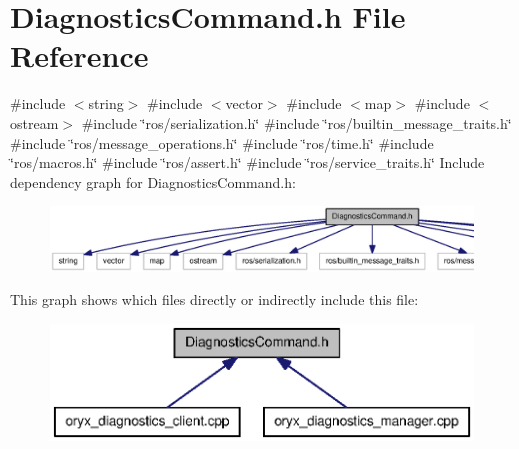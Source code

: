 \section{\-Diagnostics\-Command.\-h \-File \-Reference}
\label{DiagnosticsCommand_8h}
{\ttfamily \#include $<$string$>$}\*
{\ttfamily \#include $<$vector$>$}\*
{\ttfamily \#include $<$map$>$}\*
{\ttfamily \#include $<$ostream$>$}\*
{\ttfamily \#include \char`\"{}ros/serialization.\-h\char`\"{}}\*
{\ttfamily \#include \char`\"{}ros/builtin\-\_\-message\-\_\-traits.\-h\char`\"{}}\*
{\ttfamily \#include \char`\"{}ros/message\-\_\-operations.\-h\char`\"{}}\*
{\ttfamily \#include \char`\"{}ros/time.\-h\char`\"{}}\*
{\ttfamily \#include \char`\"{}ros/macros.\-h\char`\"{}}\*
{\ttfamily \#include \char`\"{}ros/assert.\-h\char`\"{}}\*
{\ttfamily \#include \char`\"{}ros/service\-\_\-traits.\-h\char`\"{}}\*
\-Include dependency graph for \-Diagnostics\-Command.\-h\-:
\nopagebreak
\begin{figure}[H]
\begin{center}
\leavevmode
\includegraphics[width=350pt]{DiagnosticsCommand_8h__incl}
\end{center}
\end{figure}
\-This graph shows which files directly or indirectly include this file\-:
\nopagebreak
\begin{figure}[H]
\begin{center}
\leavevmode
\includegraphics[width=350pt]{DiagnosticsCommand_8h__dep__incl}
\end{center}
\end{figure}
